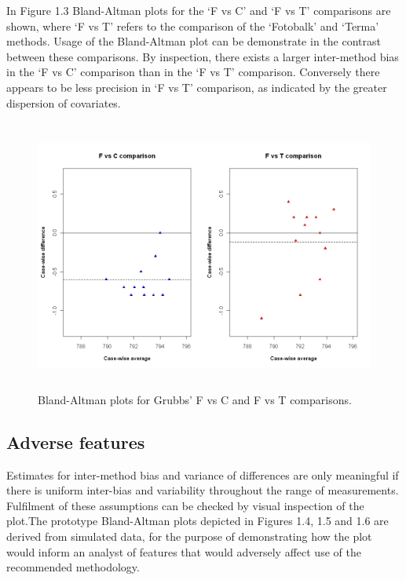 \documentclass[12pt, a4paper]{report}
\theoremstyle{plain}
\theoremstyle{definition}
\theoremstyle{remark}
\begin{document}
	
	
	In Figure 1.3 Bland-Altman plots for the `F vs C' and `F vs T'
	comparisons are shown, where `F vs T' refers to the comparison of
	the `Fotobalk' and `Terma' methods. Usage of the Bland-Altman plot
	can be demonstrate in the contrast between these comparisons. By inspection, there exists a larger inter-method bias in the `F vs C' comparison than in the `F vs T' comparison. Conversely there
	appears to be less precision in `F vs T' comparison, as indicated
	by the greater dispersion of covariates.
	
	\begin{figure}[h!]
		\begin{center}
			\includegraphics[height=90mm]{images/GrubbsDataTwoBAplots.jpeg}
			\caption{Bland-Altman plots for Grubbs' F vs C and F vs T comparisons.}\label{GrubbsDataTwoBAplots}
		\end{center}
	\end{figure}
	
	\newpage
	
	
	\subsection{Adverse features}
	
	Estimates for inter-method bias and variance of differences are only meaningful if there is uniform inter-bias and variability throughout the range of measurements. Fulfilment of these assumptions can be checked by visual inspection of the plot.The prototype Bland-Altman plots depicted in Figures 1.4, 1.5 and 1.6 are derived from simulated data, for the purpose of demonstrating how the plot would inform an analyst of features that would adversely affect use of the recommended methodology.
	
\end{document}
